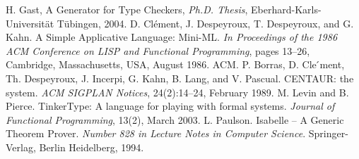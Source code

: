 \documentclass[a4paper,12pt]{article}
\begin{document}
\begin{thebibliography}{99}
	 H. Gast, A Generator for Type Checkers, \textit{Ph.D. Thesis}, Eberhard-Karls-Universit\"at T\"ubingen, 2004.
	 D. Cl\'{e}ment, J. Despeyroux, T. Despeyroux, and G. Kahn. A Simple Applicative Language: Mini-ML. \textit{In Proceedings of the 1986 ACM Conference on LISP and Functional Programming}, pages 13–26, Cambridge, Massachusetts, USA, August 1986. ACM.
	 P. Borras, D. Cle ́ment, Th. Despeyroux, J. Incerpi, G. Kahn, B. Lang, and V. Pascual. CENTAUR: the system. \textit{ACM SIGPLAN Notices}, 24(2):14–24, February 1989.
	 M. Levin and B. Pierce. TinkerType: A language for playing with formal systems. \textit{Journal of Functional Programming}, 13(2), March 2003.
	 L. Paulson. Isabelle – A Generic Theorem Prover. \textit{Number 828 in Lecture Notes in Computer Science}. Springer-Verlag, Berlin Heidelberg, 1994.
\end{thebibliography}
\end{document}
